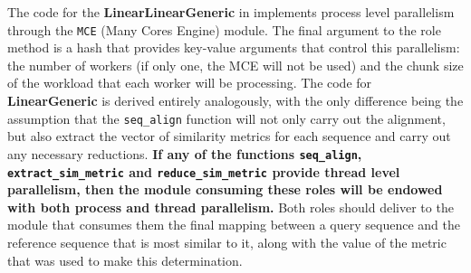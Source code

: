 \documentclass[10pt]{article}
\begin{document}
\noindent The code for the \textbf{LinearLinearGeneric}  in  implements process level parallelism through the \texttt{MCE} (Many Cores Engine) module. The final argument to the role method is a hash that provides key-value arguments that control this parallelism: the number of workers (if only one, the MCE will not be used) and the chunk size of the workload that each worker will be processing. The code for \textbf{LinearGeneric} is derived entirely analogously, with the only difference being the assumption that the \texttt{seq\_align} function will not only carry out the alignment, but also extract the vector of similarity metrics for each sequence and carry out any necessary reductions. \textbf{If any of the functions \texttt{seq\_align}, \texttt{extract\_sim\_metric} and \texttt{reduce\_sim\_metric} provide thread level parallelism, then the module consuming these roles will be endowed with both process and thread parallelism.} Both roles should deliver to the module that consumes them the final mapping between a query sequence and the reference sequence that is most similar to it, along with the value of the metric that was used to make this determination.
\end{document}
